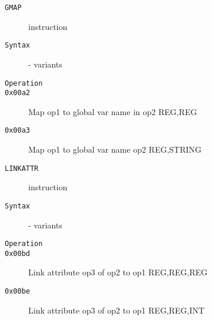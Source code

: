 \begin{description}
\item[\texttt{GMAP}] instruction\\
\item[\texttt{Syntax}] - variants\\

\item[\texttt{Operation}]
\item[\texttt{}]
\item[\texttt{0x00a2}] Map op1 to global var name in op2  {REG,REG}           \\
\item[\texttt{0x00a3}] Map op1 to global var name op2  {REG,STRING}        \\
\end{description}
\clearpage
\begin{description}
\item[\texttt{LINKATTR}] instruction\\
\item[\texttt{Syntax}] - variants\\

\item[\texttt{Operation}]
\item[\texttt{}]
\item[\texttt{0x00bd}] Link attribute op3 of op2 to op1  {REG,REG,REG}       \\
\item[\texttt{0x00be}] Link attribute op3 of op2 to op1  {REG,REG,INT}       \\
\end{description}
\clearpage
